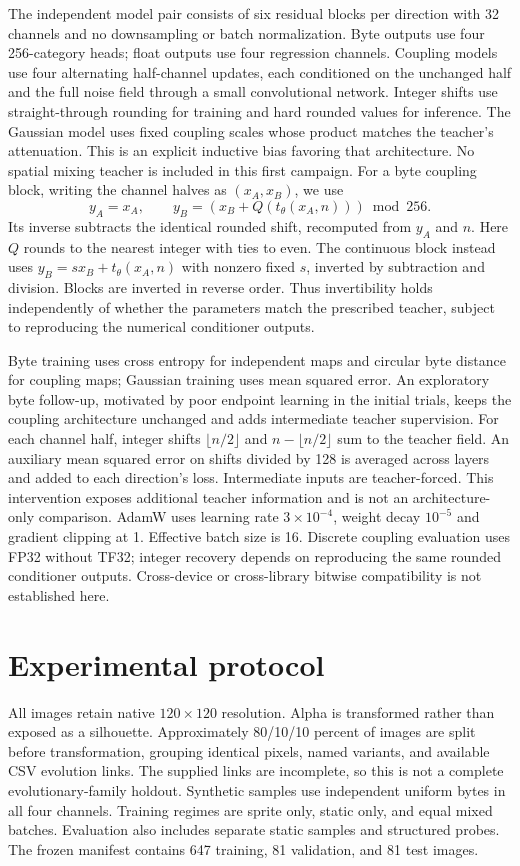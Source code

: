 \documentclass[10pt]{article}
\begin{document}
The independent model pair consists of six residual blocks per direction with
32 channels and no downsampling or batch normalization. Byte outputs use four
256-category heads; float outputs use four regression channels. Coupling models
use four alternating half-channel updates, each conditioned on the unchanged half
and the full noise field through a small convolutional network. Integer shifts
use straight-through rounding for training and hard rounded values for inference.
The Gaussian model uses fixed coupling scales whose product matches the teacher's
attenuation. This is an explicit inductive bias favoring that architecture.
No spatial mixing teacher is included in this first campaign.
For a byte coupling block, writing the channel halves as $(x_A,x_B)$, we use
\begin{equation}
y_A=x_A,\qquad y_B=(x_B+Q(t_\theta(x_A,n)))\bmod256.
\end{equation}
Its inverse subtracts the identical rounded shift, recomputed from $y_A$ and $n$.
Here $Q$ rounds to the nearest integer with ties to even. The continuous block
instead uses $y_B=sx_B+t_\theta(x_A,n)$ with nonzero fixed $s$, inverted by
subtraction and division. Blocks are inverted in reverse order. Thus invertibility
holds independently of whether the parameters match the prescribed teacher,
subject to reproducing the numerical conditioner outputs.

Byte training uses cross entropy for independent maps and circular byte distance
for coupling maps; Gaussian training uses mean squared error. An exploratory
byte follow-up, motivated by poor endpoint learning in the initial trials, keeps
the coupling architecture unchanged and adds intermediate teacher supervision.
For each channel half, integer shifts $\lfloor n/2\rfloor$ and
$n-\lfloor n/2\rfloor$ sum to the teacher field. An auxiliary mean squared error
on shifts divided by 128 is averaged across layers and added to each direction's
loss. Intermediate inputs are teacher-forced. This intervention exposes additional
teacher information and is not an architecture-only comparison. AdamW uses learning
rate $3\times10^{-4}$, weight decay $10^{-5}$ and gradient clipping at 1.
Effective batch size is 16. Discrete coupling evaluation uses FP32 without TF32;
integer recovery depends on reproducing the same rounded conditioner outputs.
Cross-device or cross-library bitwise compatibility is not established here.

\section{Experimental protocol}
All images retain native $120\times120$ resolution. Alpha is transformed rather
than exposed as a silhouette. Approximately 80/10/10 percent of images are split
before transformation, grouping identical pixels, named variants, and available
CSV evolution links. The supplied links are incomplete, so this is not a complete
evolutionary-family holdout. Synthetic samples use independent uniform bytes in
all four channels. Training regimes are sprite only, static only, and equal mixed
batches. Evaluation also includes separate static samples and structured probes.
The frozen manifest contains 647 training, 81 validation, and 81 test images.
\end{document}
